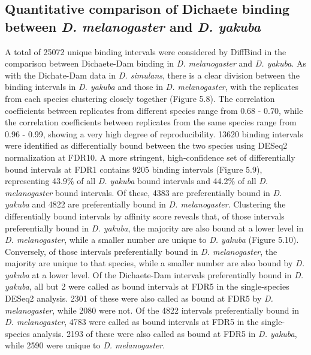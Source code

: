 \subsection{Quantitative comparison of Dichaete binding between \emph{D. melanogaster} and \emph{D. yakuba}}
A total of 25072 unique binding intervals were considered by DiffBind in the comparison between Dichaete-Dam binding in \emph{D. melanogaster} and \emph{D. yakuba}. As with the Dichate-Dam data in \emph{D. simulans}, there is a clear division between the binding intervals in \emph{D. yakuba} and those in \emph{D. melanogaster}, with the replicates from each species clustering closely together (Figure 5.8). The correlation coefficients between replicates from different species range from 0.68 - 0.70, while the correlation coefficients between replicates from the same species range from 0.96 - 0.99, showing a very high degree of reproducibility. 13620 binding intervals were identified as differentially bound between the two species using DESeq2 normalization at FDR10. A more stringent, high-confidence set of differentially bound intervals at FDR1 contains 9205 binding intervals (Figure 5.9), representing 43.9\% of all \emph{D. yakuba} bound intervals and 44.2\% of all \emph{D. melanogaster} bound intervals. Of these, 4383 are preferentially bound in \emph{D. yakuba} and 4822 are preferentially bound in \emph{D. melanogaster}. Clustering the differentially bound intervals by affinity score reveals that, of those intervals preferentially bound in \emph{D. yakuba}, the majority are also bound at a lower level in \emph{D. melanogaster}, while a smaller number are unique to \emph{D. yakuba} (Figure 5.10). Conversely, of those intervals preferentially bound in \emph{D. melanogaster}, the majority are unique to that species, while a smaller number are also bound by \emph{D. yakuba} at a lower level. Of the Dichaete-Dam intervals preferentially bound in \emph{D. yakuba}, all but 2 were called as bound intervals at FDR5 in the single-species DESeq2 analysis. 2301 of these were also called as bound at FDR5 by \emph{D. melanogaster}, while 2080 were not. Of the 4822 intervals preferentially bound in \emph{D. melanogaster}, 4783 were called as bound intervals at FDR5 in the single-species analysis. 2193 of these were also called as bound at FDR5 in \emph{D. yakuba}, while 2590 were unique to \emph{D. melanogaster}.

